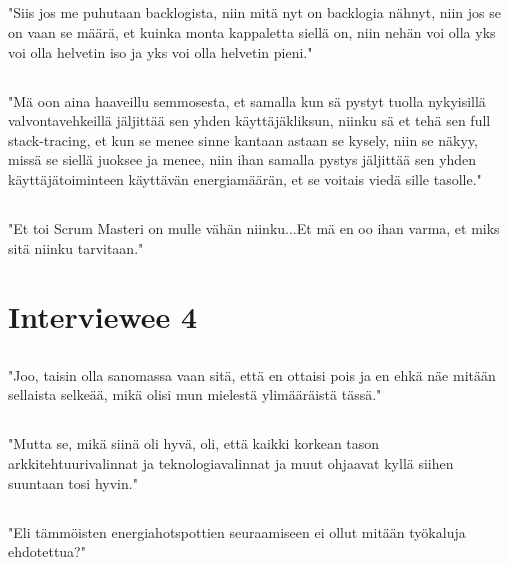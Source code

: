 \subsection{}\label{i32}
"Siis jos me puhutaan backlogista, niin mitä nyt on backlogia nähnyt, niin jos se on vaan se määrä, et kuinka monta kappaletta siellä on, niin nehän voi olla yks voi olla helvetin iso ja yks voi olla helvetin pieni."
\subsection{}\label{i33}
"Mä oon aina haaveillu semmosesta, et samalla kun sä pystyt tuolla nykyisillä valvontavehkeillä jäljittää sen yhden käyttäjäkliksun, niinku sä et tehä sen full stack-tracing, et kun se menee sinne kantaan astaan se kysely, niin se näkyy, missä se siellä juoksee ja menee, niin ihan samalla pystys jäljittää sen yhden käyttäjätoiminteen käyttävän energiamäärän, et se voitais viedä sille tasolle."
\subsection{}\label{i34}
"Et toi Scrum Masteri on mulle vähän niinku...Et mä en oo ihan varma, et miks sitä niinku tarvitaan."

\section{Interviewee 4}
\subsection{}\label{i41}
"Joo, taisin olla sanomassa vaan sitä, että en ottaisi pois ja en ehkä näe mitään sellaista selkeää, mikä olisi mun mielestä ylimääräistä tässä."
\subsection{}\label{i42}
"Mutta se, mikä siinä oli hyvä, oli, että kaikki korkean tason arkkitehtuurivalinnat ja teknologiavalinnat ja muut ohjaavat kyllä siihen suuntaan tosi hyvin."
\subsection{}\label{i43}
"Eli tämmöisten energiahotspottien seuraamiseen ei ollut mitään työkaluja ehdotettua?"